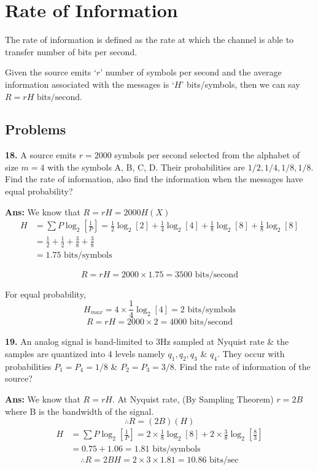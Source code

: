 \documentclass[12pt]{article}
\begin{document}
\section{Rate of Information}
The rate of information is defined as the rate at which the channel is able to transfer number of bits per second.

Given the source emits `$r$' number of symbols per second and the average information associated with the messages is `$H$' bits/symbols, then we can say $R = rH \text{ bits/second}$.

\subsection{Problems}

\textbf{18.} A source emits $r = 2000$ symbols per second selected from the alphabet of size $m = 4$ with the symbols A, B, C, D. Their probabilities are $1/2, 1/4, 1/8, 1/8$. Find the rate of information, also find the information when the messages have equal probability?

\textbf{Ans:} We know that $R = rH = 2000H(X)$
\begin{align*}
	H & = \sum P \log_2 \left[ \frac{1}{P} \right] = \frac{1}{2}\log_2[2] + \frac{1}{4}\log_2[4] + \frac{1}{8}\log_2[8] + \frac{1}{8}\log_2[8] \\
	  & = \frac{1}{2} + \frac{1}{2} + \frac{3}{8} + \frac{3}{8}                                                                                \\
	  & = 1.75 \text{ bits/symbols}
\end{align*}

$$R = rH = 2000 \times 1.75 = 3500 \text{ bits/second}$$

For equal probability,
$$H_{max} = 4 \times \frac{1}{4}\log_2[4] = 2 \text{ bits/symbols}$$
$$R = rH = 2000 \times 2 = 4000 \text{ bits/second}$$

\vspace{0.5cm}
\noindent \textbf{19.} An analog signal is band-limited to 3Hz sampled at Nyquist rate \& the samples are quantized into 4 levels namely $q_1, q_2, q_3$ \& $q_4$. They occur with probabilities $P_1 = P_4 = 1/8$ \& $P_2 = P_3 = 3/8$. Find the rate of information of the source?

\textbf{Ans:} We know that $R = rH$.
At Nyquist rate, (By Sampling Theorem) $r = 2B$ where B is the bandwidth of the signal.
$$ \therefore R = (2B)(H) $$
\begin{align*}
	H & = \sum P \log_2 \left[ \frac{1}{P} \right] = 2 \times \frac{1}{8}\log_2[8] + 2 \times \frac{3}{8}\log_2\left[\frac{8}{3}\right] \\
	  & = 0.75 + 1.06 = 1.81 \text{ bits/symbols}
\end{align*}
$$ \therefore R = 2BH = 2 \times 3 \times 1.81 = 10.86 \text{ bits/sec}$$
\end{document}
